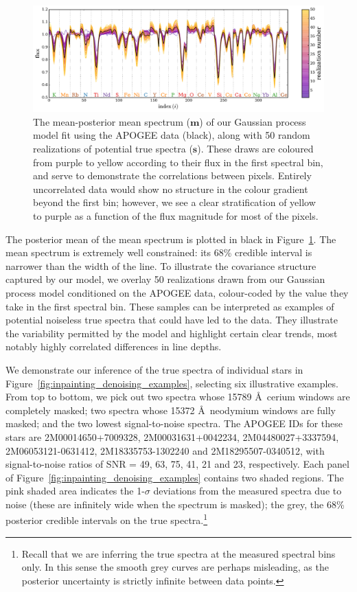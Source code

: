 \documentclass[a4paper,fleqn,usenatbib]{mnras}
\newcommand{\specmean}{{\bm m}}
\newcommand{\objspec}{{\bm s}}
\begin{document}
\begin{figure}
	\includegraphics[width=2\columnwidth]{apogee_centers_final_29502_spc_iw_prior_win_wid_1p5_gp_realizations.pdf}
    \caption{The mean-posterior mean spectrum ($\specmean$) of our Gaussian process model fit using the APOGEE data (black), along with 50 random realizations of potential true spectra ($\objspec$). These draws are coloured from purple to yellow according to their flux in the first spectral bin, and serve to demonstrate the correlations between pixels. Entirely uncorrelated data would show no structure in the colour gradient beyond the first bin; however, we see a clear stratification of yellow to purple as a function of the flux magnitude for most of the pixels.}
    \label{fig:gp_reals}
\end{figure}

The posterior mean of the mean spectrum is plotted in black in Figure~\ref{fig:gp_reals}. The mean spectrum is extremely well constrained: its 68\% credible interval is narrower than the width of the line. To illustrate the covariance structure captured by our model, we overlay 50 realizations drawn from our Gaussian process model conditioned on the APOGEE data, colour-coded by the value they take in the first spectral bin. These samples can be interpreted as examples of potential noiseless true spectra that could have led to the data. They illustrate the variability permitted by the model and highlight certain clear trends, most notably highly correlated differences in line depths.

We demonstrate our inference of the true spectra of individual stars in Figure~\ref{fig:inpainting_denoising_examples}, selecting six illustrative examples. From top to bottom, we pick out two spectra whose 15789 \AA\ cerium windows are completely masked; two spectra whose 15372 \AA\ neodymium windows are fully masked; and the two lowest signal-to-noise spectra. The APOGEE IDs for these stars are 2M00014650+7009328, 2M00031631+0042234, 2M04480027+3337594, 2M06053121-0631412, 2M18335753-1302240 and 2M18295507-0340512, with signal-to-noise ratios of SNR = 49, 63, 75, 41, 21 and 23, respectively. Each panel of Figure~\ref{fig:inpainting_denoising_examples} contains two shaded regions. The pink shaded area indicates the 1-$\sigma$ deviations from the measured spectra due to noise (these are infinitely wide when the spectrum is masked); the grey, the 68\% posterior credible intervals on the true spectra.\footnote{Recall that we are inferring the true spectra at the measured spectral bins only. In this sense the smooth grey curves are perhaps misleading, as the posterior uncertainty is strictly infinite between data points.}
\end{document}
